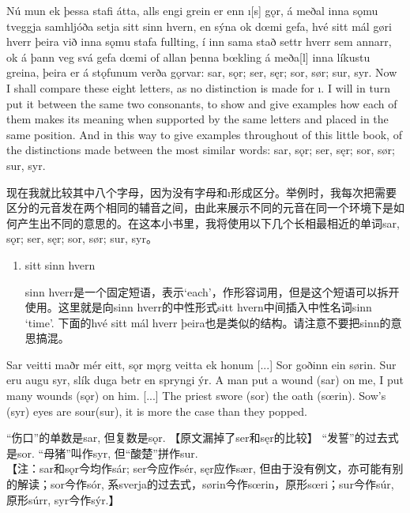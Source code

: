 \begin{paracol}{2}
    Nú mun ek þessa stafi átta, alls engi grein er enn ı[s] gǫr, á meðal inna sǫmu tveggja samhljóða setja sitt sinn hvern, en sýna ok dœmi gefa, hvé sitt mál gøri hverr þeira við inna sǫmu stafa fullting, í inn sama stað settr hverr sem annarr, ok á þann veg svá gefa dœmi of allan þenna bœkling á meða[l] inna líkustu greina, þeira er á stǫfunum verða gǫrvar: sar, sǫr; ser, sęr; sor, sør; sur, syr.
    \switchcolumn
    Now I shall compare these eight letters, as no distinction is made for ı. I will in turn  put it between the same two consonants, to show and give examples how each of them makes its  meaning when supported by the same letters and placed in the same position. And in this way to give examples throughout of this little book, of the distinctions made between the most similar words: sar, sǫr; ser, sęr; sor, sør; sur, syr.
\end{paracol}
\begin{translation*}{}
    现在我就比较其中八个字母，因为没有字母和ı形成区分。举例时，我每次把需要区分的元音发在两个相同的辅音之间，由此来展示不同的元音在同一个环境下是如何产生出不同的意思的。在这本小书里，我将使用以下几个长相最相近的单词sar, sǫr; ser, sęr; sor, sør; sur, syr。
\end{translation*}
\begin{grammar*}{}
    \begin{enumerate}[leftmargin=*]
        \item sitt sinn hvern

              sinn hverr是一个固定短语，表示`each'，作形容词用，但是这个短语可以拆开使用。这里就是向sinn hverr的中性形式sitt hvern中间插入中性名词sinn `time'. 下面的hvé sitt mál hverr þeira也是类似的结构。请注意不要把sinn的意思搞混。
    \end{enumerate}
\end{grammar*}
\begin{paracol}{2}
    Sar veitti maðr mér eitt, sǫr mǫrg veitta ek honum [...] Sor goðinn ein sørin. Sur eru augu syr, slík duga betr en spryngi ýr.
    \switchcolumn
    A man put a wound (sar) on me, I put many wounds (sǫr) on him. [...] The priest swore (sor) the oath (sœrin). Sow's (syr) eyes are sour(sur), it is more the case than they popped.
\end{paracol}
\begin{translation*}{}
    “伤口”的单数是sar, 但复数是sǫr. 【原文漏掉了ser和sęr的比较】 “发誓”的过去式是sor. “母猪”叫作syr, 但“酸楚”拼作sur.\\

    【注：sar和sǫr今均作sár; ser今应作sér, sęr应作sær, 但由于没有例文，亦可能有别的解读；sor今作sór, 系sverja的过去式，sørin今作sœrin，原形sœri；sur今作súr, 原形súrr, syr今作sýr.】
\end{translation*}

